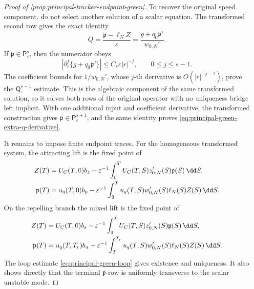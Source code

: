 \begin{proof}[Proof of \cref{prop:principal-tracker-endpoint-green}]
To recover the original speed component, do not select another solution of
a scalar equation.  The transformed second row gives the exact identity
\begin{equation}
 Q=\frac{\mathfrak p-\ell_NZ}{\varepsilon}
  =\frac{g+q_0\mathfrak p'}{w_{0,N}'}.             \label{eq:principal-green-Q-recovery}
\end{equation}
If \(\mathfrak p\in\mathsf P_\varepsilon^s\), then the numerator obeys
\begin{equation}
 \left|\partial_r^j\{g+q_0\mathfrak p'\}\right|
 \le C_s\varepsilon|r|^{-j},\qquad0\le j\le s-1. \label{eq:principal-green-Q-forcing}
\end{equation}
The coefficient bounds for \(1/w_{0,N}'\), whose \(j\)-th derivative is
\(O(|r|^{-j-1})\), prove the
\(\mathsf Q_\varepsilon^{s-1}\) estimate.  This is the algebraic component
of the same transformed solution, so it solves both rows of the original
operator with no uniqueness bridge left implicit.  With one additional
input and coefficient derivative, the transformed construction gives
\(\mathfrak p\in\mathsf P_\varepsilon^{s+1}\), and the same identity proves
\cref{eq:principal-green-extra-q-derivative}.

It remains to impose finite endpoint traces.  For the homogeneous transformed
system, the attracting lift is the fixed point of
\begin{align}
 Z(T)&=U_C(T,0)b_z-\varepsilon^{-1}
   \int_0^TU_C(T,S)z_{0,N}'(S)\mathfrak p(S)\,\dd S,\notag\\
 \mathfrak p(T)&=u_q(T,0)b_p-\varepsilon^{-1}
   \int_0^Tu_q(T,S)w_{0,N}'(S)\ell_N(S)Z(S)\,\dd S. \label{eq:principal-green-attracting-LP}
\end{align}
On the repelling branch the mixed lift is the fixed point of
\begin{align}
 Z(T)&=U_C(T,0)b_s-\varepsilon^{-1}
   \int_0^TU_C(T,S)z_{0,N}'(S)\mathfrak p(S)\,\dd S,\notag\\
 \mathfrak p(T)&=u_q(T,T_r)b_u+\varepsilon^{-1}
   \int_T^{T_r}u_q(T,S)w_{0,N}'(S)\ell_N(S)Z(S)\,\dd S.
                                                               \label{eq:principal-green-repelling-LP}
\end{align}
The loop estimate \cref{eq:principal-green-loop} gives existence and
uniqueness.  It also shows directly that the terminal
\(\mathfrak p\)-row is uniformly transverse to the scalar unstable mode.


\end{proof}
